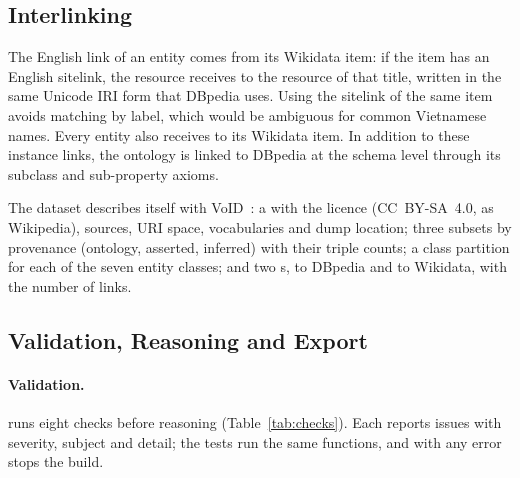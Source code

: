 \subsection{Interlinking}
\label{sec:interlinking}

The English link of an entity comes from its Wikidata item: if the item has an
English sitelink, the resource receives  to the 
resource of that title, written in the same Unicode IRI form that DBpedia
uses. Using the sitelink of the same item avoids matching by label, which
would be ambiguous for common Vietnamese names. Every entity also receives
 to its Wikidata item. In addition to these instance links, the ontology is linked
to DBpedia at the schema level through its subclass and sub-property axioms.

The dataset describes itself with VoID~\cite{alexander2011void}: a
 with the licence (CC~BY-SA~4.0, as Wikipedia), sources, URI
space, vocabularies and dump location; three subsets by provenance (ontology,
asserted, inferred) with their triple counts; a class partition for each of the
seven entity classes; and two s, to DBpedia and to Wikidata,
with the number of links.

\subsection{Validation, Reasoning and Export}
\label{sec:postprocess}

\paragraph{Validation.}  runs eight checks before reasoning
(Table~\ref{tab:checks}). Each reports issues with severity, subject and
detail; the tests run the same functions, and with
 any error stops the build.


